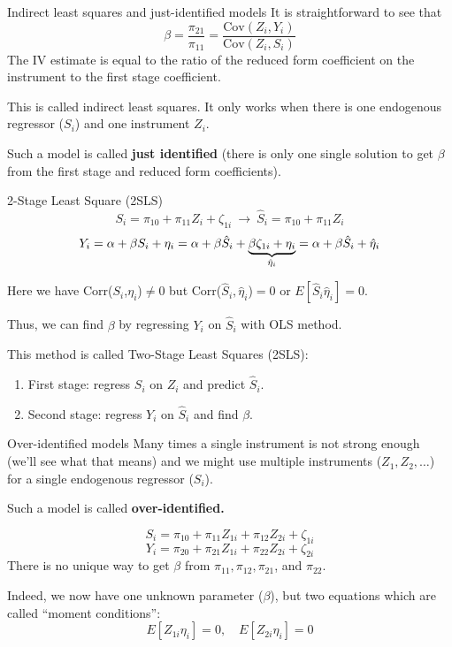 \documentclass{beamer}
\begin{document}
\begin{frame}{Indirect least squares and just-identified models}
It is straightforward to see that
\[\beta = \frac{\pi_{21}}{\pi_{11}}=\frac{\text{Cov}(Z_i,Y_i)}{\text{Cov}(Z_i,S_i)}\]
The IV estimate is equal to the ratio of the reduced form coefficient on the instrument to the first stage coefficient.\bigskip

This is called indirect least squares.
It only works when there is one endogenous regressor ($S_i$) and one instrument $Z_i$. \medskip

Such a model is called \textbf{just identified }(there is
only one single solution to get $\beta$ from the first stage and reduced form coefficients).
\end{frame}


\begin{frame}{2-Stage Least Square (2SLS)}
\[S_i = \pi_{10} + \pi_{11}Z_i + \zeta_{1i} \ \rightarrow \ \hat{S}_i = \pi_{10} + \pi_{11}Z_i \]
\[Y_i = \alpha + \beta S_i + \eta_i = \alpha + \beta \hat{S}_i + \underbrace{\beta \zeta_{1i}+\eta_i}_{\hat{\large \eta}_i}=\alpha + \beta \hat{S}_i+\hat{\eta}_i \]

Here we have Corr($S_i$,$\eta_i$)$\neq0$ but Corr($\hat{S}_i,\hat{\eta}_i$)$=0$ or $E[\hat{S}_i\hat{\eta}_i]=0$. \medskip

Thus, we can find $\beta$ by regressing $Y_i$ on $\hat{S}_i$ with OLS method.\medskip

This method is called Two-Stage Least Squares (2SLS):
\begin{enumerate}
\item First stage: regress $S_i$ on $Z_i$ and predict $\hat{S}_i$.
\item Second stage: regress $Y_i$ on $\hat{S}_i$ and find $\beta$.
\end{enumerate}
\end{frame}

\begin{frame}{Over-identified models}
Many times a single instrument is not strong enough (we'll see what that means) and we might use multiple instruments ($Z_1, Z_2,\dots$) for a single endogenous regressor ($S_i$).\medskip

Such a model is called \textbf{over-identified.}

\[S_i = \pi_{10} + \pi_{11}Z_{1i} + \pi_{12}Z_{2i} + \zeta_{1i}\]
\[Y_i = \pi_{20} + \pi_{21}Z_{1i} + \pi_{22}Z_{2i} + \zeta_{2i} \]
There is no unique way to get $\beta$ from $\pi_{11}, \pi_{12}, \pi_{21}$, and $\pi_{22}$. \medskip

Indeed, we now have one unknown parameter ($\beta$), but two equations which are called ``moment conditions'': \[E[Z_{1i}\eta_i]=0 ,\quad E[Z_{2i}\eta_i]=0\]



\end{frame}
\end{document}
